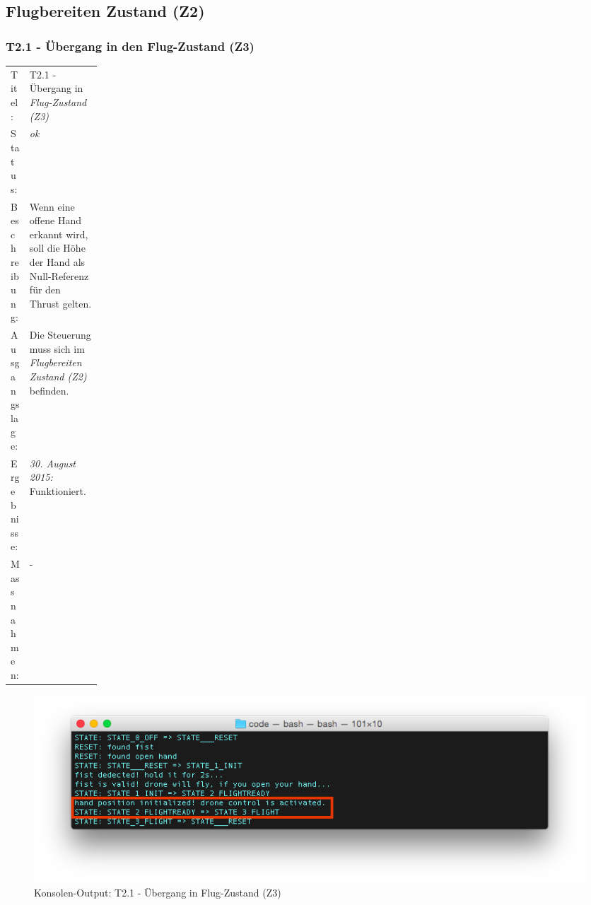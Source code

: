 
\newpage
\subsection{Flugbereiten Zustand (Z2)}
\subsubsection{T2.1 - Übergang in den Flug-Zustand (Z3)}
\begin{table}[H]
	\centering
	\small\renewcommand{\arraystretch}{1.4}
	\begin{tabularx}{0.9\textwidth}{ L{0.15\linewidth} | X  }%
		\hline
		Titel: & T2.1 - Übergang in \textit{Flug-Zustand (Z3)}\\
		Status: & \textit{ok}\\
		Beschreibung: &  Wenn eine offene Hand erkannt wird, soll die Höhe der Hand als Null-Referenz für den Thrust gelten.
		\\
		Ausgangslage: & Die Steuerung muss sich im \textit{Flugbereiten Zustand (Z2)} befinden.\\
		Ergebnisse: & \textit{30. August 2015:}
		Funktioniert.
		\\
		Massnahmen: & -\\
		\hline
	\end{tabularx}
\end{table}
\begin{figure}[H]
	\centering
	\includegraphics[width=1.0\textwidth]{images/testing/t2_1_success_state_3.png}
	\caption{Konsolen-Output: T2.1 - Übergang in Flug-Zustand (Z3)}
	\vspace{-1\baselineskip}
\end{figure}

\newpage
